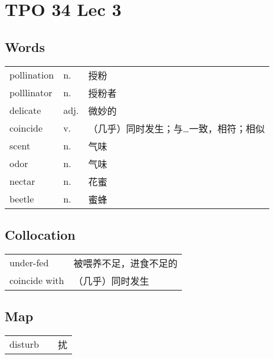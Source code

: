 \section{TPO 34 Lec 3}

\subsection{Words}

\begin{tabular}{lll}
    pollination & n.   & 授粉                  \\
    polllinator & n.   & 授粉者                 \\
    delicate    & adj. & 微妙的                 \\
    coincide    & v.   & （几乎）同时发生；与…一致，相符；相似 \\
    scent       & n.   & 气味                  \\
    odor        & n.   & 气味                  \\
    nectar      & n.   & 花蜜                  \\
    beetle      & n.   & 蜜蜂                  \\
\end{tabular}

\subsection{Collocation}

\begin{tabular}{ll}
    under-fed     & 被喂养不足，进食不足的 \\
    coincide with & （几乎）同时发生    \\
\end{tabular}

\subsection{Map}

\begin{tabular}{rc@{\quad$\to$\quad}l}
    disturb &  & 扰 \\
\end{tabular}
